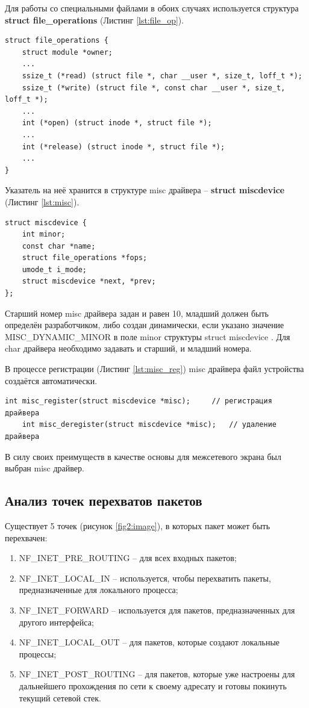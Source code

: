 Для работы со специальными файлами в обоих случаях используется структура \textbf{struct file\_operations} (Листинг \ref{lst:file_op}). 
\begin{lstlisting}[caption = {struct file\_operations}, label=lst:file_op]
struct file_operations {
	struct module *owner;
	...
	ssize_t (*read) (struct file *, char __user *, size_t, loff_t *);
	ssize_t (*write) (struct file *, const char __user *, size_t, loff_t *);
	...
	int (*open) (struct inode *, struct file *);
	...
	int (*release) (struct inode *, struct file *);
	...
}
\end{lstlisting}

Указатель на неё хранится в структуре misc драйвера -- \textbf{struct miscdevice} (Листинг \ref{lst:misc}).
\begin{lstlisting}[caption = {struct miscdevice}, label=lst:misc]
struct miscdevice {
	int minor;
	const char *name;
	struct file_operations *fops;
	umode_t i_mode;
	struct miscdevice *next, *prev;
};
\end{lstlisting}

Старший номер misc драйвера задан и равен 10, младший должен быть определён разработчиком, либо создан динамически, если указано значение MISC\_DYNAMIC\_MINOR в поле minor структуры struct miscdevice \cite{3d}. Для char драйвера необходимо задавать и старший, и младший номера.

В процессе регистрации (Листинг \ref{lst:misc_reg}) misc драйвера файл устройства создаётся автоматически.

\begin{lstlisting}[caption = {Функции для регистрации и удаления misc драйвера}, label=lst:misc_reg]
	int misc_register(struct miscdevice *misc);		// регистрация драйвера
	int misc_deregister(struct miscdevice *misc);	// удаление драйвера
\end{lstlisting}

В силу своих преимуществ в качестве основы для межсетевого экрана был выбран misc драйвер.

\subsection{Анализ точек перехватов пакетов}
Существует 5 точек (рисунок \ref{fig2:image}), в которых пакет может быть перехвачен:
\begin{enumerate}
	\item NF\_INET\_PRE\_ROUTING – для всех входных пакетов;
	\item NF\_INET\_LOCAL\_IN – используется, чтобы перехватить пакеты, предназначенные для локального процесса;
	\item NF\_INET\_FORWARD – используется для пакетов, предназначенных для другого интерфейса;
	\item NF\_INET\_LOCAL\_OUT – для пакетов, которые создают локальные процессы;
	\item NF\_INET\_POST\_ROUTING – для пакетов, которые уже настроены для дальнейшего прохождения по сети к своему адресату и готовы покинуть текущий сетевой стек.
\end{enumerate}

